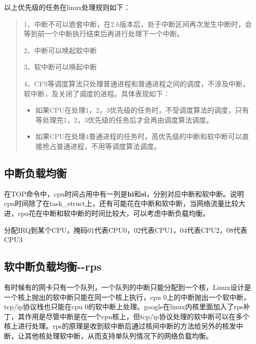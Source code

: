 以上优先级的任务在linux处理规则如下：

\begin{quote}
1、中断不可以嵌套中断，在2.6版本后，处于中断区间再次发生中断时，会等到前一个中断执行结束后再进行处理下一个中断。

2、中断可以唤起软中断

3、软中断可以唤起中断

4、CFS等调度算法只处理普通进程和普通进程之间的调度，不涉及中断，软中断，及关闭了调度的进程。具体表现如下：

\begin{itemize}
\item
  如果CPU在处理1，2，3优先级的任务时，不受调度算法的调度，只有等处理完1，2，3优先级的任务后才会再由调度算法调度。
\item
  如果CPU在处理4普通进程的任务时，高优先级的中断和软中断可以直接抢占普通进程，不用等调度算法调度。
\end{itemize}
\end{quote}

\hypertarget{header-n39}{%
\subsection{中断负载均衡}\label{header-n39}}

在TOP命令中，cpu时间占用中有一列是\textbf{hi}和\textbf{si}，分别对应中断和软中断。说明cpu时间除了在task\_struct上，还有可能花在中断和软中断，当网络流量比较大进，cpu花在中断和软中断的时间比较大，可以考虑中断负载均衡。

分配IRQ到某个CPU，掩码01代表CPU0，02代表CPU1，04代表CPU2，08代表CPU3

\begin{Shaded}
\begin{Highlighting}[]
\NormalTok{[}\NormalTok{ ~] }
\NormalTok{[}\NormalTok{ ~] }
\end{Highlighting}
\end{Shaded}

\hypertarget{header-n47}{%
\subsection{软中断负载均衡-\/-rps}\label{header-n47}}

有时候有的网卡只有一个队列，一个队列的中断只能分配到一个核，Linux设计是一个核上抛出的软中断只能在同一个核上执行，cpu
0上的中断抛出一个软中断，tcp/ip协议栈也只能在cpu
0的软中断上处理。google在linux内核里面加入了rps补丁，其作用是尽管中断是在一个cpu核上，但tcp/ip协议处理的软中断可以在多个核上进行处理。rps的原理是收到软中断后通过核间中断的方法给另外的核发中断，让其他核处理软中断，从而支持单队列情况下的网络负载均衡。


